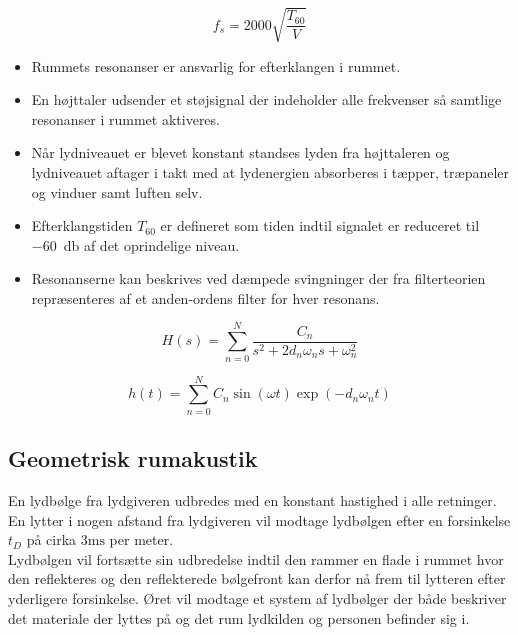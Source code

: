 \begin{equation}
f_s = 2000 \sqrt{\dfrac{T_{60}}{V}}
\end{equation}

\begin{itemize}
	\item Rummets resonanser er ansvarlig for efterklangen i rummet.
	\item En højttaler udsender	et støjsignal der indeholder alle frekvenser så samtlige resonanser i rummet aktiveres. 
	\item Når lydniveauet er blevet konstant standses lyden fra højttaleren og lydniveauet aftager i takt med at lydenergien absorberes i tæpper, træpaneler og vinduer samt luften selv.
	\item Efterklangstiden $T_{60}$ er defineret som tiden indtil signalet er reduceret til \SI{-60}{\decibel} af det oprindelige niveau.
	\item Resonanserne kan beskrives ved dæmpede svingninger der fra filterteorien repræsenteres af et anden-ordens filter for hver resonans.
\end{itemize}

\begin{equation}
H(s)=\sum_{n=0}^{N}\dfrac{C_n}{s^2+2d_n\omega_n s+\omega_n^2}
\end{equation}

\begin{equation}
h(t)=\sum_{n=0}^{N} C_n \sin(\omega t) \exp(-d_n\omega_n t)
\end{equation}

\subsection{Geometrisk rumakustik}
En lydbølge fra lydgiveren udbredes med en konstant hastighed i alle retninger. 
En lytter i nogen afstand fra lydgiveren vil modtage lydbølgen efter en forsinkelse $t_D$ på cirka $3 \si{\milli\second}$ per meter.\\

Lydbølgen vil fortsætte sin udbredelse indtil den rammer en flade i rummet hvor den reflekteres og den reflekterede bølgefront kan derfor nå frem til lytteren efter yderligere forsinkelse. 
Øret vil modtage et system af lydbølger der både beskriver det materiale der lyttes på og det rum lydkilden og personen befinder sig i.
